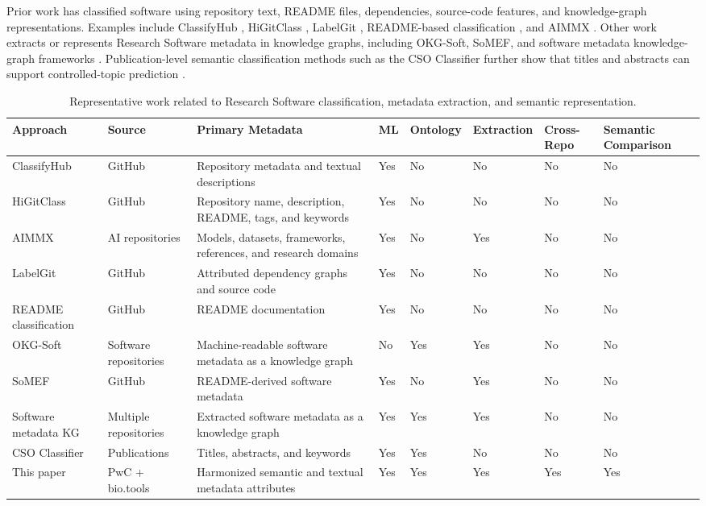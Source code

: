 \documentclass[pdflatex,sn-mathphys-num]{sn-jnl}%
\theoremstyle{thmstyleone}%
\theoremstyle{thmstyletwo}%
\theoremstyle{thmstylethree}%
\begin{document}
Prior work has classified software using repository text, README files, dependencies, source-code features, and knowledge-graph representations. Examples include ClassifyHub \cite{Soll2017ClassifyHub}, HiGitClass \cite{Zhang2019HiGitClass}, LabelGit \cite{Sas2021LabelGit}, README-based classification \cite{Prana2019README}, and AIMMX \cite{Tsay2020AIMMX}. Other work extracts or represents Research Software metadata in knowledge graphs, including OKG-Soft, SoMEF, and software metadata knowledge-graph frameworks \cite{Garijo2019OKGSoft,Mao2019SoMEF,Kelley2021SoftwareKG}. Publication-level semantic classification methods such as the CSO Classifier further show that titles and abstracts can support controlled-topic prediction \cite{Salatino2019CSOClassifier}.

\begin{table}[htbp]
\centering
\caption{Representative work related to Research Software classification, metadata extraction, and semantic representation.}
\label{tab:related-work-comparison}
\scriptsize
\setlength{\tabcolsep}{3pt}
\begin{tabularx}{\textwidth}{p{2.7cm}p{1.8cm}Xp{0.7cm}p{0.9cm}p{1.2cm}p{1.2cm}p{1.5cm}}
\toprule
Approach & Source & Primary Metadata & ML & Ontology & Extraction & Cross-Repo & Semantic Comparison \\
\midrule
ClassifyHub \cite{Soll2017ClassifyHub} & GitHub & Repository metadata and textual descriptions & Yes & No & No & No & No \\
HiGitClass \cite{Zhang2019HiGitClass} & GitHub & Repository name, description, README, tags, and keywords & Yes & No & No & No & No \\
AIMMX \cite{Tsay2020AIMMX} & AI repositories & Models, datasets, frameworks, references, and research domains & Yes & No & Yes & No & No \\
LabelGit \cite{Sas2021LabelGit} & GitHub & Attributed dependency graphs and source code & Yes & No & No & No & No \\
README classification \cite{Prana2019README} & GitHub & README documentation & Yes & No & No & No & No \\
OKG-Soft \cite{Garijo2019OKGSoft} & Software repositories & Machine-readable software metadata as a knowledge graph & No & Yes & Yes & No & No \\
SoMEF \cite{Mao2019SoMEF} & GitHub & README-derived software metadata & Yes & No & Yes & No & No \\
Software metadata KG \cite{Kelley2021SoftwareKG} & Multiple repositories & Extracted software metadata as a knowledge graph & Yes & Yes & Yes & No & No \\
CSO Classifier \cite{Salatino2019CSOClassifier} & Publications & Titles, abstracts, and keywords & Yes & Yes & No & No & No \\
\midrule
This paper & PwC + bio.tools & Harmonized semantic and textual metadata attributes & Yes & Yes & Yes & Yes & Yes \\
\bottomrule
\end{tabularx}
\end{table}
\end{document}
